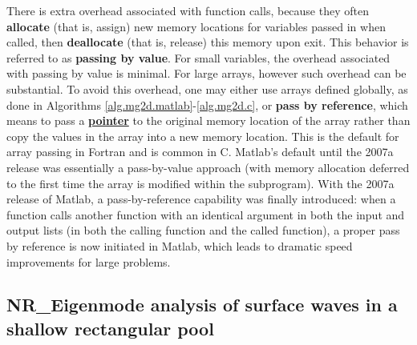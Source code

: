\enlargethispage{10pt}

There is extra overhead associated with function calls, because they often
{\bf allocate} (that is, assign) new memory locations for variables passed in when called, then {\bf deallocate} (that is, release) this memory
upon exit.  This behavior is referred to as {\bf passing by value}.  For small variables, the overhead associated with passing by value is minimal.
For large arrays, however such overhead can be substantial.  To avoid this overhead, one may either use arrays defined globally,
as done in Algorithms \ref{alg.mg2d.matlab}-\ref{alg.mg2d.c}, or {\bf pass by reference}, which means to pass a \href{http://www.cs.stanford.edu/cslibrary/PointerFunCBig.avi}{\bf pointer}
to the original memory location of the array rather than copy the values in the array into a new memory location.
This is the default for array passing in Fortran and is common in C.  Matlab's default until the 2007a release was essentially a pass-by-value approach (with memory allocation deferred
to the first time the array is modified within the subprogram).  With the 2007a release of Matlab, a pass-by-reference capability was finally introduced:
when a function calls another function with an identical argument in both the input and output lists (in both the calling function and the called function),
a proper pass by reference is now initiated in Matlab, which leads to dramatic speed improvements for large problems.

\subsection{NR_Eigenmode analysis of surface waves in a shallow rectangular pool}\label{sec.A.C.B.2d}
\enlargethispage{10pt}

